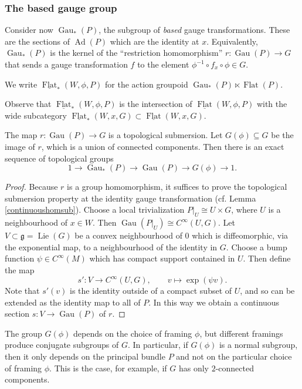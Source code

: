 \documentclass[10pt]{amsart}
\newcommand{\FlatCat}{{\underline{\operatorname{Flat}}}}
\newcommand{\FlatObj}{{\operatorname{Flat}}}
\DeclareMathOperator{\Lie}{Lie}
\DeclareMathOperator{\Gau}{Gau}
\DeclareMathOperator{\Ad}{Ad}
\numberwithin{theoremalpha}{section}
\numberwithin{equation}{section}
\numberwithin{definition}{section}
\numberwithin{theorem}{section}
\numberwithin{proposition}{section}
\numberwithin{lemma}{section}
\numberwithin{example}{section}
\numberwithin{remark}{section}
\numberwithin{corollary}{section}
\numberwithin{question}{section}
\numberwithin{problem}{section}
\numberwithin{assumption}{section}
\theoremstyle{named}
\numberwithin{equation}{section}
\begin{document}
\subsubsection{The based gauge group}

Consider now $\Gau_{*}(P)$, the subgroup of \emph{based} gauge transformations. These are the sections of $\Ad(P)$ which are the identity at $x$. Equivalently, $\Gau_{*}(P)$ is the kernel of the ``restriction homomorphism'' $r: \Gau(P) \to G$ that sends a gauge transformation $f$ to the element $\phi^{-1} \circ f_{x} \circ \phi \in G$.
\begin{definition}
We write $\FlatCat_{*}(W, \phi, P)$ for the action groupoid $\Gau_{*}(P) \ltimes \FlatObj(P)$.
\end{definition}
Observe that $\FlatCat_{*}(W, \phi, P)$ is the intersection of $\FlatCat(W, \phi, P)$ with the wide subcategory $\FlatCat_{*}(W, x, G) \subset \FlatCat(W, x, G)$.

\begin{lemma} \label{surjectivegauge}
The map $r: \Gau(P) \to G$ is a topological submersion. Let $G(\phi) \subseteq G$ be the image of $r$, which is a union of connected components. Then there is an exact sequence of topological groups 
\[ 1 \to \Gau_{*}(P) \to \Gau(P) \to G(\phi) \to 1. \]
\end{lemma}
\begin{proof}
Because $r$ is a group homomorphism, it suffices to prove the topological submersion property at the identity gauge transformation (cf. Lemma \ref{continuoushomsub}). Choose a local trivialization $P|_{U} \cong U \times G$, where $U$ is a neighbourhood of $x \in W$. Then $\Gau(P|_{U}) \cong C^{\infty}(U,G)$. Let $V \subset \mathfrak{g} = \Lie(G)$ be a convex neighbourhood of $0$ which is diffeomorphic, via the exponential map, to a neighbourhood of the identity in $G$. Choose a bump function $\psi \in C^{\infty}(M)$ which has compact support contained in $U$. Then define the map 
\[ s': V \to C^{\infty}(U, G), \qquad v \mapsto \exp(\psi v). \]
Note that $s'(v)$ is the identity outside of a compact subset of $U$, and so can be extended as the identity map to all of $P$. In this way we obtain a continuous section $s: V \to  \Gau(P)$ of $r$.
\end{proof}
\begin{remark} \label{Gphiconj} The group $G(\phi)$ depends on the choice of framing $\phi$, but different framings produce conjugate subgroups of $G$. In particular, if $G(\phi)$ is a normal subgroup, then it only depends on the principal bundle $P$ and not on the particular choice of framing $\phi$. This is the case, for example, if $G$ has only $2$-connected components. 
\end{remark}
\end{document}

